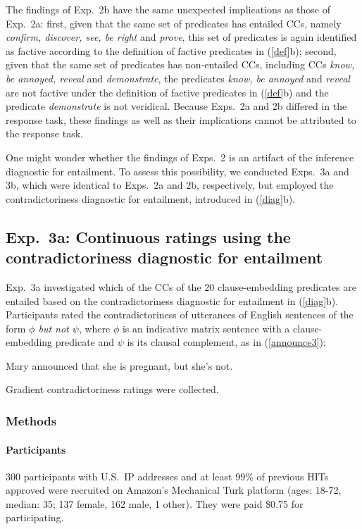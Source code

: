 \documentclass[11pt,fleqn]{article}
\newcommand{\6}{\mbox{$[\hspace*{-.6mm}[$}}
\newcommand{\9}{\mbox{$]\hspace*{-.6mm}]$}}
\begin{document}
The findings of Exp.~2b have the same unexpected implications as those of Exp.~2a: first, given that the same set of predicates has entailed CCs, namely {\em confirm, discover, see, be right} and {\em prove}, this set of predicates is again identified as factive according to the definition of factive predicates in (\ref{def}b); second, given that the same set of predicates has non-entailed CCs, including CCs {\em know, be annoyed, reveal} and {\em demonstrate}, the predicates {\em know, be annoyed} and {\em reveal} are not factive under the definition of factive predicates in (\ref{def}b) and the predicate {\em demonstrate} is not veridical. Because Exps.~2a and 2b differed in the response task, these findings as well as their implications cannot be attributed to the response task.

One might wonder whether the findings of Exps.~2 is an artifact of the inference diagnostic for entailment. To assess this possibility, we conducted Exps.~3a and 3b, which were identical to Exps.~2a and 2b, respectively, but employed the contradictoriness diagnostic for entailment, introduced in (\ref{diag}b).

\subsection{Exp.~3a: Continuous ratings using the contradictoriness diagnostic for entailment}\label{s32}

Exp.~3a investigated which of the CCs of the 20 clause-embedding predicates are entailed based on the contradictoriness diagnostic for entailment in (\ref{diag}b). Participants rated the contradictoriness of utterances of English sentences of the form {\em $\phi$ but not $\psi$}, where $\phi$ is an indicative matrix sentence with a clause-embedding predicate and $\psi$ is its clausal complement, as in (\ref{announce3}):

\begin{exe}
\ex\label{announce3} Mary announced that she is pregnant, but she's not.
\end{exe}
Gradient contradictoriness ratings were collected.

\subsubsection{Methods}

\paragraph{Participants} 300 participants with U.S.\ IP addresses and at least 99\% of previous HITs approved were recruited on Amazon's Mechanical Turk platform (ages: 18-72, median: 35; 137 female, 162 male, 1 other). They were paid \$0.75 for participating.
\end{document}
